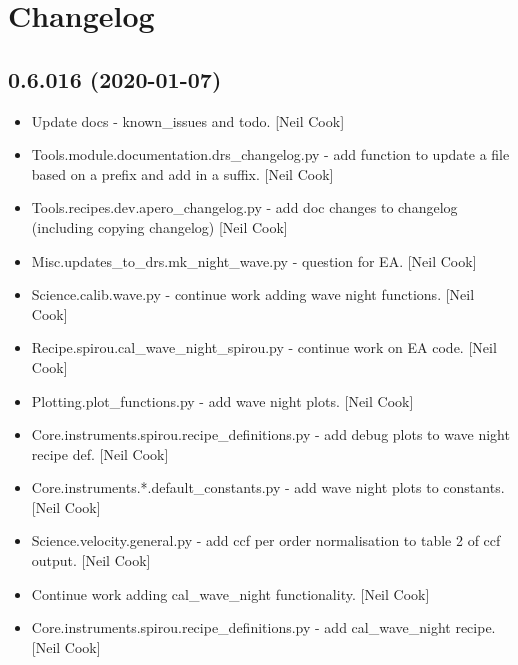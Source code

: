 \documentclass[a4paper,10pt,english]{report}
\begin{document}
\section{Changelog}
\label{\detokenize{misc/changelog:changelog}}\label{\detokenize{misc/changelog::doc}}

\subsection{0.6.016 (2020-01-07)}
\label{\detokenize{misc/changelog:id1}}\begin{itemize}
\item {} 
Update docs - known\_issues and todo. {[}Neil Cook{]}

\item {} 
Tools.module.documentation.drs\_changelog.py - add function to update a
file based on a prefix and add in a suffix. {[}Neil Cook{]}

\item {} 
Tools.recipes.dev.apero\_changelog.py - add doc changes to changelog
(including copying changelog) {[}Neil Cook{]}

\item {} 
Misc.updates\_to\_drs.mk\_night\_wave.py - question for EA. {[}Neil Cook{]}

\item {} 
Science.calib.wave.py - continue work adding wave night functions.
{[}Neil Cook{]}

\item {} 
Recipe.spirou.cal\_wave\_night\_spirou.py - continue work on EA code.
{[}Neil Cook{]}

\item {} 
Plotting.plot\_functions.py - add wave night plots. {[}Neil Cook{]}

\item {} 
Core.instruments.spirou.recipe\_definitions.py - add debug plots to
wave night recipe def. {[}Neil Cook{]}

\item {} 
Core.instruments.*.default\_constants.py - add wave night plots to
constants. {[}Neil Cook{]}

\item {} 
Science.velocity.general.py - add ccf per order normalisation to table
2 of ccf output. {[}Neil Cook{]}

\item {} 
Continue work adding cal\_wave\_night functionality. {[}Neil Cook{]}

\item {} 
Core.instruments.spirou.recipe\_definitions.py - add cal\_wave\_night
recipe. {[}Neil Cook{]}


\end{itemize}
\end{document}
